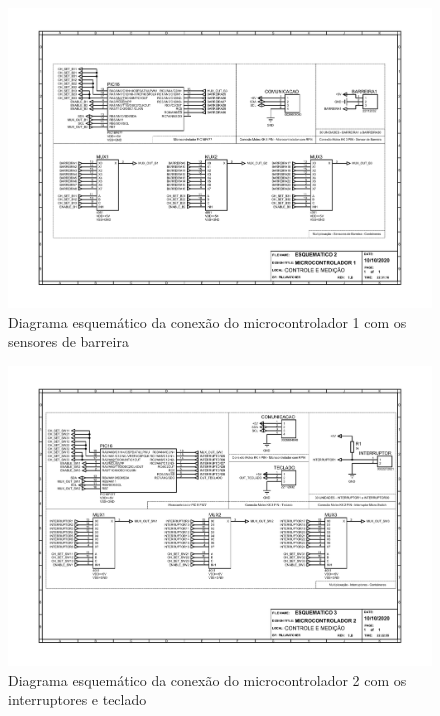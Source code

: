 \begin{apendicesenv}
\begin{landscape}
\begin{figure}[H]
    \centering
    \includegraphics[width=1.25\textwidth, height=2\textheight,keepaspectratio]{figuras/esquematico_eletronica/esquematico_2_micro1.pdf}
    \caption{Diagrama esquemático da conexão do microcontrolador 1 com os sensores de barreira}
    \label{fig:esquematico_2}
\end{figure}
\end{landscape}

\begin{landscape}
\begin{figure}[H]
    \centering
    \includegraphics[width=1.25\textwidth, height=2\textheight,keepaspectratio]{figuras/esquematico_eletronica/esquematico_3_micro2.pdf}
    \caption{Diagrama esquemático da conexão do microcontrolador 2 com os interruptores e teclado}
    \label{fig:esquematico_3}
\end{figure}
\end{landscape}


\end{apendicesenv}
